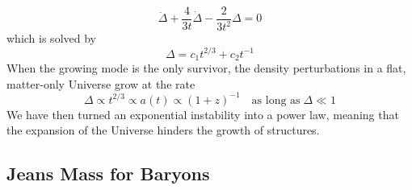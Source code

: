 \begin{equation*}
    \ddot{\Delta} + \frac{4}{3t}\dot{\Delta} -\frac{2}{3t^{2}}\Delta = 0
\end{equation*}
which is solved by
\begin{equation*}
    \Delta = c_{1}t^{2/3} + c_{2}t^{-1}
\end{equation*}
When the growing mode is the only survivor, the density perturbations in a flat, matter-only Universe grow at the rate 
$$ \Delta \propto t^{2/3} \propto a(t) \propto (1+z)^{-1} \quad \text{as long as}\; \Delta \ll 1 $$
We have then turned an exponential instability into a power law, meaning that the expansion of the Universe hinders the growth of structures.

\subsection{Jeans Mass for Baryons}

